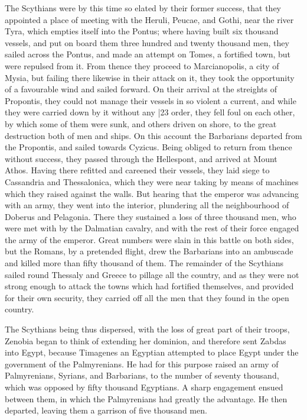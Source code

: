 The Scythians were by this time so elated by their former success, that they appointed a place of meeting with the Heruli, Peucae, and Gothi, near the river Tyra, which empties itself into the Pontus; where having built six thousand vessels, and put on board them three hundred and twenty thousand men, they sailed across the Pontus, and made an attempt on Tomes, a fortified town, but were repulsed from it. From thence they proceed to Marcianopolis, a city of Mysia, but failing there likewise in their attack on it, they took the opportunity of a favourable wind and sailed forward. On their arrival at the streights of Propontis, they could not manage their vessels in so violent a current, and while they were carried down by it without any
|23 order, they fell foul on each other, by which some of them were sunk, and others driven on shore, to the great destruction both of men and ships. On this account the Barbarians departed from the Propontis, and sailed towards Cyzicus. Being obliged to return from thence without success, they passed through the Hellespont, and arrived at Mount Athos. Having there refitted and careened their vessels, they laid siege to Cassandria and Thessalonica, which they were near taking by means of machines which they raised against the walls. But hearing that the emperor was advancing with an army, they went into the interior, plundering all the neighbourhood of Doberus and Pelagonia. There they sustained a loss of three thousand men, who were met with by the Dalmatian cavalry, and with the rest of their force engaged the army of the emperor. Great numbers were slain in this battle on both sides, but the Romans, by a pretended flight, drew the Barbarians into an ambuscade and killed more than fifty thousand of them. The remainder of the Scythians sailed round Thessaly and Greece to pillage all the country, and as they were not strong enough to attack the towns which had fortified themselves, and provided for their own security, they carried off all the men that they found in the open country.

The Scythians being thus dispersed, with the loss of great part of their troops, Zenobia began to think of extending her dominion, and therefore sent Zabdas into Egypt, because Timagenes an Egyptian attempted to place Egypt under the government of the Palmyrenians. He had for this purpose raised an army of Palmyrenians, Syrians, and Barbarians, to the number of seventy thousand, which was opposed by fifty thousand Egyptians. A sharp engagement ensued between them, in which the Palmyrenians had greatly the advantage. He then departed, leaving them a garrison of five thousand men.

